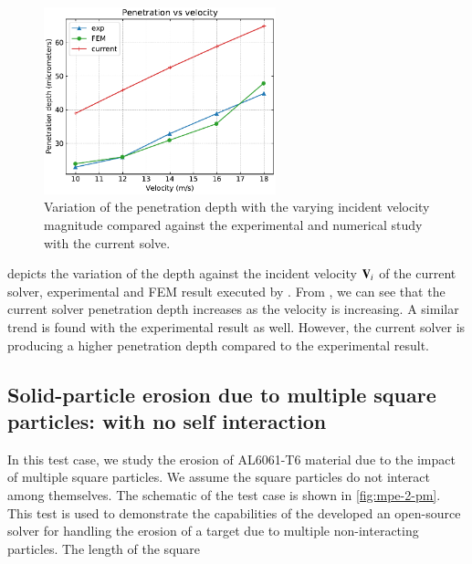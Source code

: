 \begin{figure}[!htpb]
  \centering
  \includegraphics[width=0.6\textwidth]{figures/erosion/figures/cao_xuerui_2022_spherical_particle_impact_3d/penetration_vs_velocity}
  \caption{Variation of the penetration depth with the varying incident velocity
    magnitude compared against the experimental and numerical study with the
    current solve.}
  \label{fig:results-sphere-target-impact-vel-vs-depth}
\end{figure}
 depicts the variation of
the depth against the incident velocity $\mathbf{V}_i$ of the current solver,
experimental and FEM result executed by \cite{zang2022investigation}. From
, we can see that the
current solver penetration depth increases as the velocity is increasing. A
similar trend is found with the experimental result as well. However, the
current solver is producing a higher penetration depth compared to the
experimental result.

\subsection{Solid-particle erosion due to multiple square particles: with no self
  interaction}
\label{sec:res:mpe-2}
In this test case, we study the erosion of AL6061-T6 material due to the
impact of multiple square particles. We assume the square particles do not
interact among themselves. The schematic of the test case is shown in
\cref{fig:mpe-2-pm}. This test is used to demonstrate the capabilities of the
developed an open-source solver for handling the erosion of a target due to multiple
non-interacting particles. The length of the square

